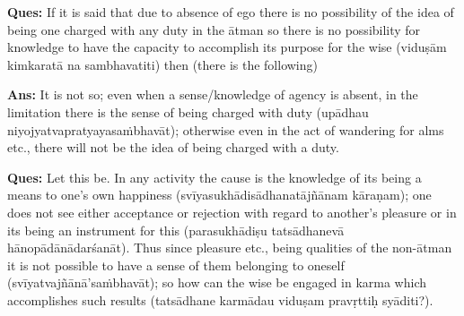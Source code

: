 

\textbf{Ques:} If it is said that due to absence of ego there is no possibility of the idea of being one charged with any duty in the ātman so there is no possibility for knowledge  to have the capacity to accomplish its purpose for the wise (viduṣām kimkaratā na sambhavatiti) then (there is the following)

\textbf{Ans:} It is not so; even when a sense/knowledge of agency is absent,  in the limitation there is the sense of being charged with duty (upādhau niyojyatvapratyayasaṁbhavāt); otherwise even in the act of wandering for alms etc., there will not be the idea of being charged with a duty.

\textbf{Ques:} Let this be. In any activity the cause is the knowledge of its being a means to one’s own happiness (svīyasukhādisādhanatājñānam kāraṇam); one does not see either acceptance or rejection with regard to another’s pleasure or in its being an instrument for this (parasukhādiṣu tatsādhanevā hānopādānādarśanāt). Thus since pleasure etc., being qualities of the non-ātman it is not possible to have a sense of them belonging to oneself (svīyatvajñānā’saṁbhavāt); so how can the wise be engaged in karma which accomplishes such results (tatsādhane karmādau viduṣam pravṛttiḥ syāditi?).


